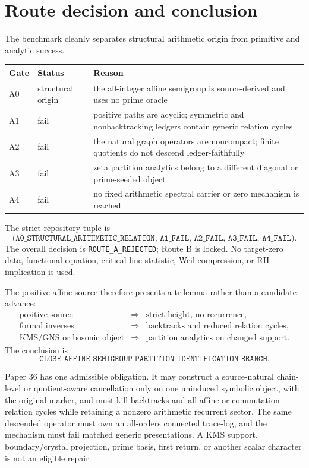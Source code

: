 \section{Route decision and conclusion}
\label{sec:conclusion}

The benchmark cleanly separates structural arithmetic origin from primitive
and analytic success.

\begin{table}[htbp]
\centering
\small
\begin{tabularx}{\textwidth}{@{}L{0.14\textwidth}L{0.20\textwidth}Y@{}}
\toprule
Gate & Status & Reason \\
\midrule
A0 & structural origin & the all-integer affine semigroup is source-derived and uses no prime oracle \\
A1 & fail & positive paths are acyclic; symmetric and nonbacktracking ledgers contain generic relation cycles \\
A2 & fail & the natural graph operators are noncompact; finite quotients do not descend ledger-faithfully \\
A3 & fail & zeta partition analytics belong to a different diagonal or prime-seeded object \\
A4 & fail & no fixed arithmetic spectral carrier or zero mechanism is reached \\
\bottomrule
\end{tabularx}
\end{table}

The strict repository tuple is
\[
\texttt{(A0\_STRUCTURAL\_ARITHMETIC\_RELATION, A1\_FAIL,
A2\_FAIL, A3\_FAIL, A4\_FAIL)}.
\]
The overall decision is \texttt{ROUTE\_A\_REJECTED}; Route B is locked.  No
target-zero data, functional equation, critical-line statistic, Weil
compression, or RH implication is used.

The positive affine source therefore presents a trilemma rather than a
candidate advance:
\[
\begin{array}{ccl}
\text{positive source}&\Longrightarrow&\text{strict height, no recurrence},\\
\text{formal inverses}&\Longrightarrow&\text{backtracks and reduced relation cycles},\\
\text{KMS/GNS or bosonic object}&\Longrightarrow&\text{partition analytics on changed support}.
\end{array}
\]
The conclusion is
\[
\boxed{\texttt{CLOSE\_AFFINE\_SEMIGROUP\_PARTITION\_IDENTIFICATION\_BRANCH}.}
\]

Paper 36 has one admissible obligation.  It may construct a source-natural
chain-level or quotient-aware cancellation only on one uninduced symbolic
object, with the original marker, and must kill backtracks and all affine or
commutation relation cycles while retaining a nonzero arithmetic recurrent
sector.  The same descended operator must own an all-orders connected
trace-log, and the mechanism must fail matched generic presentations.  A KMS
support, boundary/crystal projection, prime basis, first return, or another
scalar character is not an eligible repair.
